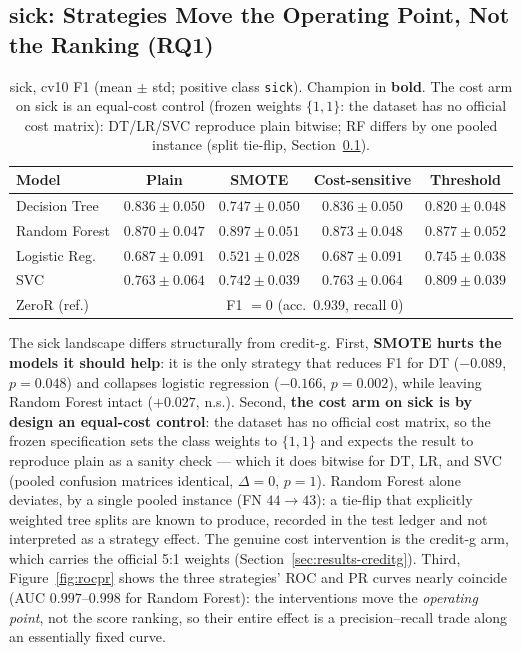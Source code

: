 \subsection{sick: Strategies Move the Operating Point, Not the Ranking (RQ1)}
\label{sec:results-sick}

\begin{table}[H]
\centering
\caption{sick, cv10 F1 (mean $\pm$ std; positive class \texttt{sick}). Champion in \textbf{bold}. The cost arm on sick is an equal-cost control (frozen weights $\{1,1\}$: the dataset has no official cost matrix): DT/LR/SVC reproduce plain bitwise; RF differs by one pooled instance (split tie-flip, Section~\ref{sec:results-sick}).}
\label{tab:sick-f1}
\begin{tabular}{lcccc}
\toprule
Model & Plain & SMOTE & Cost-sensitive & Threshold \\
\midrule
Decision Tree & $0.836\pm0.050$ & $0.747\pm0.050$ & $0.836\pm0.050$ & $0.820\pm0.048$ \\
Random Forest & $0.870\pm0.047$ & $\mathbf{0.897\pm0.051}$ & $0.873\pm0.048$ & $0.877\pm0.052$ \\
Logistic Reg. & $0.687\pm0.091$ & $0.521\pm0.028$ & $0.687\pm0.091$ & $0.745\pm0.038$ \\
SVC & $0.763\pm0.064$ & $0.742\pm0.039$ & $0.763\pm0.064$ & $0.809\pm0.039$ \\
\midrule
ZeroR (ref.) & \multicolumn{4}{c}{F1 $=0$ (acc.\ 0.939, recall 0)} \\
\bottomrule
\end{tabular}
\end{table}

The sick landscape differs structurally from credit-g. First, \textbf{SMOTE hurts the models it should help}: it is the only strategy that reduces F1 for DT ($-0.089$, $p=0.048$) and collapses logistic regression ($-0.166$, $p=0.002$), while leaving Random Forest intact ($+0.027$, n.s.). Second, \textbf{the cost arm on sick is by design an equal-cost control}: the dataset has no official cost matrix, so the frozen specification sets the class weights to $\{1,1\}$ and expects the result to reproduce plain as a sanity check --- which it does bitwise for DT, LR, and SVC (pooled confusion matrices identical, $\Delta=0$, $p=1$). Random Forest alone deviates, by a single pooled instance (FN $44\to43$): a tie-flip that explicitly weighted tree splits are known to produce, recorded in the test ledger and not interpreted as a strategy effect. The genuine cost intervention is the credit-g arm, which carries the official 5:1 weights (Section~\ref{sec:results-creditg}). Third, Figure~\ref{fig:rocpr} shows the three strategies' ROC and PR curves nearly coincide (AUC $0.997$--$0.998$ for Random Forest): the interventions move the \emph{operating point}, not the score ranking, so their entire effect is a precision--recall trade along an essentially fixed curve.

